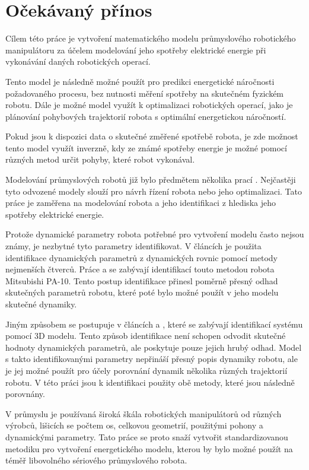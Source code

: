 \section{Očekávaný přínos}

Cílem této práce je vytvoření matematického modelu průmyslového robotického manipulátoru za účelem modelování jeho spotřeby elektrické energie při vykonávání daných robotických operací. 

Tento model je následně možné použít pro predikci energetické náročnosti požadovaného procesu, bez nutnosti měření spotřeby na skutečném fyzickém robotu. Dále je možné model využít k optimalizaci robotických operací, jako je plánování pohybových trajektorií robota s optimální energetickou náročností. 

Pokud jsou k dispozici data o skutečné změřené spotřebě robota, je zde možnost tento model využít inverzně, kdy ze známé spotřeby energie je možné pomocí různých metod určit pohyby, které robot vykonával.

Modelování průmyslových robotů již bylo předmětem několika prací \cite{rob_mod_control}\cite{handbook_of_robotics}. Nejčastěji tyto odvozené modely slouží pro návrh řízení robota nebo jeho optimalizaci. Tato práce je zaměřena na modelování robota a jeho identifikaci z hlediska jeho spotřeby elektrické energie. 

Protože dynamické parametry robota potřebné pro vytvoření modelu často nejsou známy, je nezbytné tyto parametry identifikovat. V článcích \cite{par_iden_rob}\cite{clos_dyn_par} je použita identifikace dynamických parametrů z dynamických rovnic pomocí metody nejmenších čtverců. Práce \cite{dyn_mod_ind} a \cite{dyn_ind_mits} se zabývají identifikací touto metodou robota Mitsubishi PA-10. Tento postup identifikace přinesl poměrně přesný odhad skutečných parametrů robotu, které poté bylo možné použít v jeho modelu skutečné dynamiky. 

Jiným způsobem se postupuje v článcích \cite{dyn_ind_man} a \cite{akeel}, které se zabývají identifikací systému pomocí 3D modelu. Tento způsob identifikace není schopen odvodit skutečné hodnoty dynamických parametrů, ale poskytuje pouze jejich hrubý odhad. Model s takto identifikovanými parametry nepřináší přesný popis dynamiky robotu, ale je jej možné použít pro účely porovnání dynamik několika různých trajektorií robotu. V této práci jsou k identifikaci použity obě metody, které jsou následně porovnány.

V průmyslu je používaná široká škála robotických manipulátorů od různých výrobců, lišicích se počtem os, celkovou geometrií, použitými pohony a dynamickými parametry. Tato práce se proto snaží vytvořit standardizovanou metodiku pro vytvoření energetického modelu, kterou by bylo možné použít na téměř libovolného sériového průmyslového robota.

